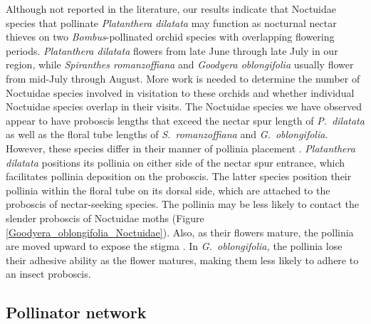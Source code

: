 \begin{multicols}{2}
Although not reported in the literature, our results indicate that
Noctuidae species that pollinate \emph{Platanthera dilatata} may
function as nocturnal nectar thieves on two \emph{Bombus}-pollinated
orchid species with overlapping flowering periods. \emph{Platanthera
dilatata} flowers from late June through late July in our region, while
\emph{Spiranthes romanzoffiana} and \emph{Goodyera oblongifolia} usually
flower from mid-July through August. More work is needed to determine
the number of Noctuidae species involved in visitation to these orchids
and whether individual Noctuidae species overlap in their visits. The
Noctuidae species we have observed appear to have proboscis lengths that
exceed the nectar spur length of \emph{P.\ dilatata} as well as the
floral tube lengths of \emph{S.\ romanzoffiana} and \emph{G.\
oblongifolia}. However, these species differ in their manner of pollinia
placement \citep{Argue2012a, Argue2012b}. %
\emph{Platanthera dilatata} positions its
pollinia on either side of the nectar spur entrance, which facilitates
pollinia deposition on the proboscis. The latter species position their
pollinia within the floral tube on its dorsal side, which are attached
to the proboscis of nectar-seeking species. The pollinia may be less
likely to contact the slender proboscis of Noctuidae moths (Figure \ref{Goodyera_oblongifolia_Noctuidae}).
Also, as their flowers mature, the pollinia are moved upward to expose
the stigma \citep{Argue2012a, Argue2012b}. %
In \emph{G.\ oblongifolia,} the pollinia lose
their adhesive ability as the flower matures, making them less likely to
adhere to an insect proboscis.

\subsection{Pollinator network}


\end{multicols}
